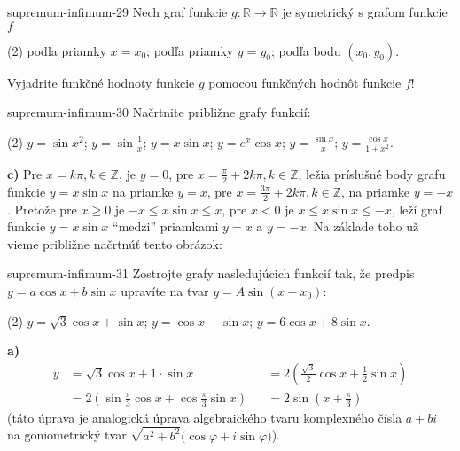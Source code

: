 \begin{defproblem}{supremum-infimum-29}
Nech graf funkcie $g:\mathbb{R}\rightarrow\mathbb{R}$ je symetrický s grafom funkcie $f$
\begin{tasks}(2)
  \task podľa priamky $x=x_0$;
  \task podľa priamky $y=y_0$;
  \task podľa bodu $(x_0,y_0)$.
\end{tasks}
Vyjadrite funkčné hodnoty funkcie $g$ pomocou funkčných hodnôt funkcie $f$!
\end{defproblem}

\begin{defproblem}{supremum-infimum-30}
Načrtnite približne grafy funkcií:
\begin{tasks}(2)
  \task $y=\sin x^2$;
  \task $y=\sin \frac{1}{x}$;
  \task $y=x\sin x$;
  \task $y=e^x\cos x$;
  \task $y=\frac{\sin x}{x}$;
  \task $y=\frac{\cos x}{1+x^2}$.
\end{tasks}

\begin{solution}
  \textbf{c)}
  Pre $x = k \pi, k \in \mathbb{Z}$, je $y = 0$, pre $x = \frac{\pi}{2} +
  2k\pi,k\in\mathbb{Z}$, ležia príslušné body grafu funkcie $y= x \sin{x}$ na
  priamke $y = x$, pre $x = \frac{3\pi}{2} + 2k\pi, k\in\mathbb{Z}$, na priamke
  $y = -x$. Pretože pre $x \geq 0$ je $-x \leq x \sin{x} \leq x$, pre $x < 0$ je
  $x\leq x\sin x\leq -x$, leží graf funkcie $y = x\sin x$ ``medzi'' priamkami $y
  = x$ a $y = -x$. Na základe toho už vieme približne načrtnúť tento obrázok:
\end{solution}
\end{defproblem}

\begin{defproblem}{supremum-infimum-31}
Zostrojte grafy nasledujúcich funkcií tak, že predpis $y=a\cos x +b\sin x$
upravíte na tvar $y=A\sin (x-x_0)$:
\begin{tasks}(2)
  \task $y=\sqrt{3}\cos x +\sin x$;
  \task $y=\cos x -\sin x$;
  \task $y=6\cos x +8\sin x$.
\end{tasks}

\begin{solution}
\textbf{a)}
\vspace{-.5cm}
\begin{align*}
  y
    &= \sqrt{3} \cos{x} + 1 \cdot \sin{x}
      &&= 2(\frac{\sqrt{3}}{2} \cos{x} + \frac{1}{2}\sin{x}) \\
    &= 2(\sin{\frac{\pi}{3}} \cos{x} + \cos{\frac{\pi}{3}}\sin{x})
      &&= 2\sin{(x + \frac{\pi}{3})}
\end{align*}
(táto úprava je analogická úprava algebraického tvaru komplexného čísla $a + bi$
na goniometrický tvar $\sqrt{a^2 + b^2}(\cos{\varphi} + i \sin{\varphi)}$).
\end{solution}
\end{defproblem}

